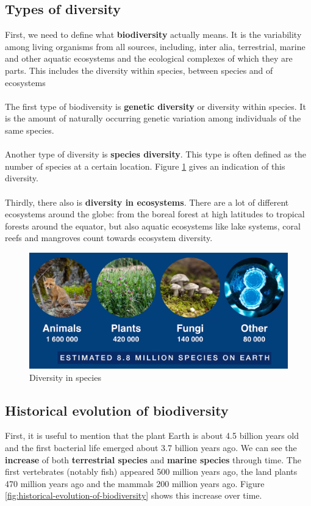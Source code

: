 \documentclass[../summary.tex]{subfiles}
\begin{document}
	\subsection{Types of diversity}
	First, we need to define what \textbf{biodiversity} actually means. It is the variability among living organisms from all sources, including, inter alia, terrestrial, marine and other aquatic ecosystems and the ecological complexes of which they are parts. This includes the diversity within species, between species and of ecosystems
	\\
	\\
	The first type of biodiversity is \textbf{genetic diversity} or diversity within species. It is the amount of naturally occurring genetic variation among individuals of the same species. 
	\\
	\\
	Another type of diversity is \textbf{species diversity}. This type is often defined as the number of species at a certain location. Figure \ref{fig:diversity_species} gives an indication of this diversity.
	\\
	\\
	Thirdly, there also is \textbf{diversity in ecosystems}. There are a lot of different ecosystems around the globe: from the boreal forest at high latitudes to tropical forests around the equator, but also aquatic ecosystems like lake systems, coral reefs and mangroves count towards ecosystem diversity.
	\\
	\begin{figure}[H]
		\centering
		\includegraphics[width=0.75\linewidth]{images/2-diversity_species.png}
		\caption{Diversity in species}
		\label{fig:diversity_species}
	\end{figure}
	
	\subsection{Historical evolution of biodiversity}

	First, it is useful to mention that the plant Earth is about 4.5 billion years old and the first bacterial life emerged about 3.7 billion years ago. We can see the \textbf{increase} of both \textbf{terrestrial species} and \textbf{marine species} through time. The first vertebrates (notably fish) appeared 500 million years ago, the land plants 470 million years ago and the mammals 200 million years ago. Figure \ref{fig:historical-evolution-of-biodiversity} shows this increase over time.
	
\end{document}
